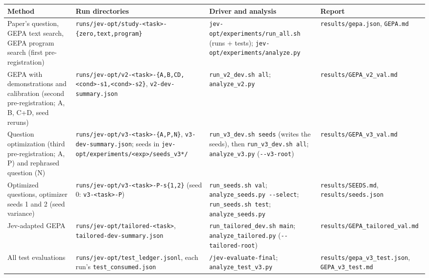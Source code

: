 \begin{table}[p]
\centering\scriptsize\setlength{\tabcolsep}{3pt}
\begin{tabular}{p{3.3cm}p{3.9cm}p{5.2cm}p{3.6cm}}
\toprule
Method & Run directories & Driver and analysis & Report \\
\midrule
Paper's question, GEPA text search, GEPA program search (first pre-registration) & \texttt{runs/\allowbreak jev-opt/\allowbreak study-<task>-\allowbreak\{zero,text,program\}} & \texttt{jev-opt/\allowbreak experiments/\allowbreak run\_all.sh} (runs + tests); \texttt{jev-opt/\allowbreak experiments/\allowbreak analyze.py} & \texttt{results/\allowbreak gepa.json}, \texttt{GEPA.md} \\
GEPA with demonstrations and calibration (second pre-registration; A, B, C+D, seed reruns) & \texttt{runs/\allowbreak jev-opt/\allowbreak v2-<task>-\allowbreak\{A,B,CD,\allowbreak <cond>-s1,\allowbreak <cond>-s2\}}, \texttt{v2-dev-summary.json} & \texttt{run\_v2\_dev.sh all}; \texttt{analyze\_v2.py} & \texttt{results/\allowbreak GEPA\_v2\_val.md} \\
Question optimization (third pre-registration; A, P) and rephrased question (N) & \texttt{runs/\allowbreak jev-opt/\allowbreak v3-<task>-\allowbreak\{A,P,N\}}, \texttt{v3-dev-summary.json}; seeds in \texttt{jev-opt/\allowbreak experiments/\allowbreak <exp>/\allowbreak seeds\_v3*/} & \texttt{run\_v3\_dev.sh seeds} (writes the seeds), then \texttt{run\_v3\_dev.sh all}; \texttt{analyze\_v3.py} (\texttt{-{}-v3-root}) & \texttt{results/\allowbreak GEPA\_v3\_val.md} \\
Optimized questions, optimizer seeds 1 and 2 (seed variance) & \texttt{runs/\allowbreak jev-opt/\allowbreak v3-<task>-\allowbreak P-s\{1,2\}} (seed 0: \texttt{v3-<task>-\allowbreak P}) & \texttt{run\_seeds.sh val}; \texttt{analyze\_seeds.py -{}-select}; \texttt{run\_seeds.sh test}; \texttt{analyze\_seeds.py} & \texttt{results/\allowbreak SEEDS.md}, \texttt{results/\allowbreak seeds.json} \\
Jev-adapted GEPA & \texttt{runs/\allowbreak jev-opt/\allowbreak tailored-<task>}, \texttt{tailored-dev-summary.json} & \texttt{run\_tailored\_dev.sh main}; \texttt{analyze\_tailored.py} (\texttt{-{}-tailored-root}) & \texttt{results/\allowbreak GEPA\_tailored\_val.md} \\
All test evaluations & \texttt{runs/\allowbreak jev-opt/\allowbreak test\_ledger.jsonl}, each run's \texttt{test\_consumed.json} & \texttt{/jev-evaluate-final}; \texttt{analyze\_test\_v3.py} & \texttt{results/\allowbreak gepa\_v3\_test.json}, \texttt{GEPA\_v3\_test.md} \\

\end{tabular}
\end{table}
